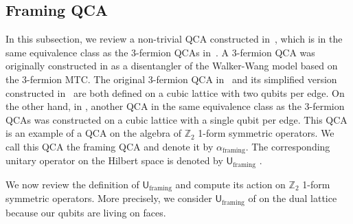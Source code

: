 \documentclass[aps,twocolumn,prx,floatfix,preprintnumbers, nofootinbib,10pt]{revtex4-2}
\numberwithin{equation}{section}
\theoremstyle{definition}
\theoremstyle{remark}
\theoremstyle{claim}
\renewcommand{\sf}[1]{\mathsf{#1}}
\begin{document}
\subsection{Framing QCA}
\label{sec: 3-fermion QCA 1-qubit version}
In this subsection, we review a non-trivial QCA constructed in~\cite{Fidkowski:2023dpe}, which is in the same equivalence class as the 3-fermion QCAs in~\cite{HaahFidkowskiHastings2023, Shirley_2022}.
A 3-fermion QCA was originally constructed in \cite{HaahFidkowskiHastings2023} as a disentangler of the Walker-Wang model based on the 3-fermion MTC.
The original 3-fermion QCA in~\cite{HaahFidkowskiHastings2023} and its simplified version constructed in~\cite[Appendix E]{Shirley_2022} are both defined on a cubic lattice with two qubits per edge.
On the other hand, in \cite{Fidkowski:2023dpe}, another QCA in the same equivalence class as the 3-fermion QCAs was constructed on a cubic lattice with a single qubit per edge.
This QCA is an example of a QCA on the algebra of $\mathbb{Z}_2$ 1-form symmetric operators.
We call this QCA the framing QCA and denote it by $\alpha_{\text{framing}}$.
The corresponding unitary operator on the Hilbert space is denoted by $\sf{U}_{\text{framing}}$ \cite{Fidkowski:2023dpe}.

We now review the definition of $\sf{U}_{\text{framing}}$ and compute its action on $\mathbb{Z}_2$ 1-form symmetric operators.
More precisely, we consider $\sf{U}_{\text{framing}}$ of \cite{Fidkowski:2023dpe} on the dual lattice because our qubits are living on faces.
\end{document}
